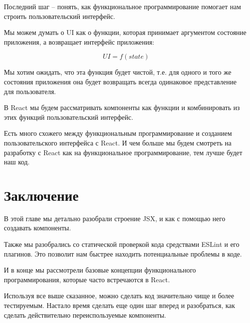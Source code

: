 Последний шаг -- понять, как функциональное программирование помогает нам строить пользовательский интерфейс. 

Мы можем думать о UI как о функции, которая принимает аргументом состояние приложения, а возвращает интерфейс приложения:

$$
UI = f(state)
$$

Мы хотим ожидать, что эта функция будет чистой, т.е. для одного и того же состояния приложения она будет возвращать всегда одинаковое представление для пользователя.

В React мы будем рассматривать компоненты как функции и комбинировать из этих функций пользовательский интерфейс.

Есть много схожего между функциональным программирование и созданием пользовательского интерфейса с React. И чем больше мы будем смотреть на разработку с React как на функциональное программирование, тем лучше будет наш код.

\section{Заключение}

В этой главе мы детально разобрали строение JSX, и как с помощью него создавать компоненты.

Также мы разобрались со статической проверкой кода средствами ESLint и его плагинов. Это позволит нам быстрее находить потенциальные проблемы в коде.

И в конце мы рассмотрели базовые концепции функционального программирования, которые часто встречаются в React. 

Используя все выше сказанное, можно сделать код значительно чище и более тестируемым. Настало время сделать еще один шаг вперед и разобраться, как сделать действительно переиспользуемые компоненты.
